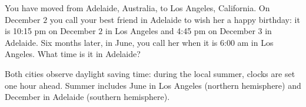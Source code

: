 You have moved from Adelaide, Australia, to Los Angeles, California. On December $2$ you call your best friend in Adelaide to wish her a happy birthday: it is 10:15 pm on December $2$ in Los Angeles and 4:45 pm on December $3$ in Adelaide. Six months later, in June, you call her when it is 6:00 am in Los Angeles. What time is it in Adelaide?

Both cities observe daylight saving time: during the local summer, clocks are set one hour ahead. Summer includes June in Los Angeles (northern hemisphere) and December in Adelaide (southern hemisphere).
